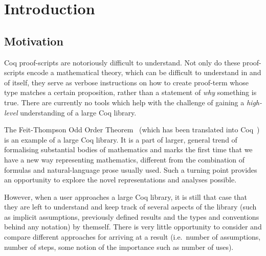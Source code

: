 \chapter{Introduction}




\section{Motivation}

Coq proof-scripts are notoriously difficult to understand. Not only do these
proof-scripts encode a mathematical theory, which can be difficult to
understand in and of itself, they serve as verbose instructions on how to
create proof-term whose type matches a certain proposition, rather than a
statement of \emph{why} something is true. There are currently no tools which
help with the challenge of gaining a \emph{high-level} understanding of a large
Coq library.

The Feit-Thompson Odd Order Theorem~\cite{peterfalvi2000oot, bender1994oot}
(which has been translated into Coq~\cite{gonthier2013oot}) is an example of a
large Coq library. It is a part of larger, general trend of formalising
substantial bodies of mathematics and marks the first time that we have a new
way representing mathematics, different from the combination of formulas and
natural-language prose usually used. Such a turning point provides an
opportunity to explore the novel representations and analyses possible.

However, when a user approaches a large Coq library, it is still that case
that they are left to understand and keep track of several aspects of the
library (such as implicit assumptions, previously defined results and the
types and conventions behind any notation) by themself. There is very little
opportunity to consider and compare different approaches for arriving at a
result (i.e.\ number of assumptions, number of steps, some notion of the
importance such as number of uses).

